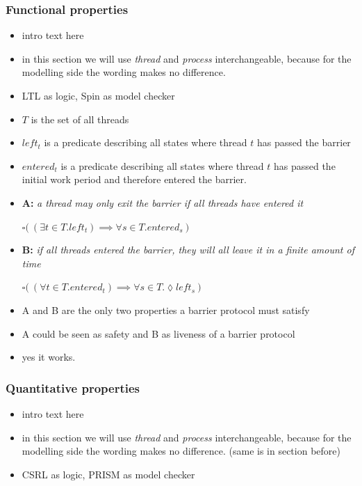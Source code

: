 \documentclass[a4paper, 10pt]{article}
\begin{document}
\subsubsection{Functional properties}
\label{sssec:analysis-modelchecking-functional-properties}
\begin{itemize}
	\item intro text here
	\item in this section we will use \emph{thread} and \emph{process} interchangeable, because for the modelling side the wording makes no difference.
	\item LTL as logic, Spin as model checker
	\item $T$ is the set of all threads
	\item $left_t$ is a predicate describing all states where thread $t$ has passed the barrier
	\item $entered_t$ is a predicate describing all states where thread $t$ has passed the initial work period and therefore entered the barrier.
	\item \textbf{A:} \emph{a thread may only exit the barrier if all threads have entered it}
		\begin{center}
			$\square \big( ~ ( \exists t \in T . \mathit{left_t} ) \implies \forall s \in T. \mathit{entered_s} ~ \big)$
		\end{center}
	\item \textbf{B:} \emph{if all threads entered the barrier, they will all leave it in a finite amount of time}
		\begin{center}
			$\square \big( ~(\forall t \in T . \mathit{entered_t} ) \implies \forall s \in T. \lozenge \mathit{left_s} ~ \big)$
		\end{center}
	\item A and B are the only two properties a barrier protocol must satisfy
	\item A could be seen as safety and B as liveness of a barrier protocol
	\item yes it works.
\end{itemize}

\subsubsection{Quantitative properties}
\label{sssec:analysis-modelchecking-quantitative-properties}
\begin{itemize}
	\item intro text here
	\item in this section we will use \emph{thread} and \emph{process} interchangeable, because for the modelling side the wording makes no difference. (same is in section before)
	\item CSRL as logic, PRISM as model checker
\end{itemize}
\end{document}
